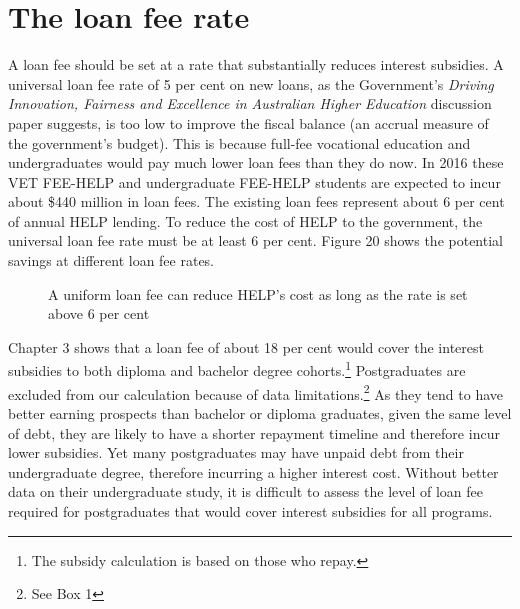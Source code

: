 \documentclass[embargoed]{grattan}
\begin{document}
\section{The loan fee rate}\label{sec:the-loan-fee-rate}

A loan fee should be set at a rate that substantially reduces interest subsidies. A universal loan fee rate of 5 per cent on new loans, as the Government's \emph{Driving Innovation, Fairness and Excellence in Australian Higher Education} discussion paper suggests, is too low to improve the fiscal balance (an accrual measure of the government's budget). This is because full-fee vocational education and undergraduates would pay much lower loan fees than they do now. In 2016 these VET FEE-HELP and undergraduate FEE-HELP students are expected to incur about \$440 million in loan fees. The existing loan fees represent about 6 per cent of annual HELP lending. To reduce the cost of HELP to the government, the universal loan fee rate must be at least 6 per cent. Figure 20 shows the potential savings at different loan fee rates.

\begin{figure}
\caption{A uniform loan fee can reduce HELP's cost as long as the rate is set above 6 per cent}\label{fig:fig20-uniform-loan-fee-can-reduce-HELPs-cost-as-long-as-the-rate-is-set-above-6pc}


%
\end{figure}

Chapter 3 shows that a loan fee of about 18 per cent would cover the interest subsidies to both diploma and bachelor degree cohorts.\footnote{The subsidy calculation is based on those who repay.} Postgraduates are excluded from our calculation because of data limitations.\footnote{See Box 1} As they tend to have better earning prospects than bachelor or diploma graduates, given the same level of debt, they are likely to have a shorter repayment timeline and therefore incur lower subsidies. Yet many postgraduates may have unpaid debt from their undergraduate degree, therefore incurring a higher interest cost. Without better data on their undergraduate study, it is difficult to assess the level of loan fee required for postgraduates that would cover interest subsidies for all programs.
\end{document}
